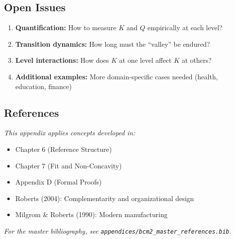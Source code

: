 
\subsection{Open Issues}

\begin{enumerate}
    \item \textbf{Quantification:} How to measure $K$ and $Q$ empirically at each level?
    \item \textbf{Transition dynamics:} How long must the ``valley'' be endured?
    \item \textbf{Level interactions:} How does $K$ at one level affect $K$ at others?
    \item \textbf{Additional examples:} More domain-specific cases needed (health, education, finance)
\end{enumerate}


\subsection{References}

\noindent\textit{This appendix applies concepts developed in:}

\begin{itemize}[nosep]
    \item Chapter 6 (Reference Structure)
    \item Chapter 7 (Fit and Non-Concavity)
    \item Appendix D (Formal Proofs)
    \item Roberts (2004): Complementarity and organizational design
    \item Milgrom \& Roberts (1990): Modern manufacturing
\end{itemize}

\noindent\textit{For the master bibliography, see \texttt{appendices/bcm2\_master\_references.bib}.}

